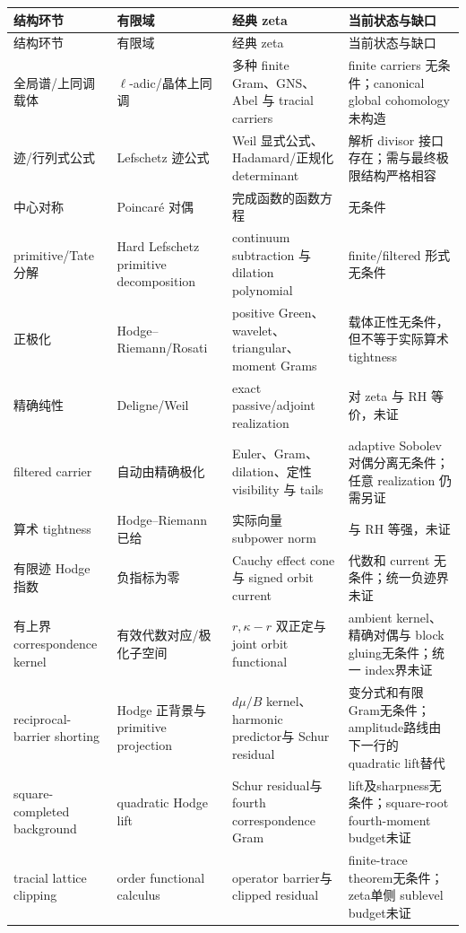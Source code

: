 \documentclass[UTF8,11pt,a4paper]{ctexart}
\theoremstyle{definition}
\theoremstyle{remark}
\newcommand{\1}{\mathbf 1}
\begin{document}
\begingroup\small
\begin{longtable}{@{}>{\raggedright\arraybackslash}p{}p{}p{}p{}@{}}
\toprule
结构环节 & 有限域 & 经典 zeta & 当前状态与缺口\\
\midrule
\endfirsthead
\toprule
结构环节 & 有限域 & 经典 zeta & 当前状态与缺口\\
\midrule
\endhead
全局谱/上同调载体 & \(\ell\)-adic/晶体上同调 & 多种 finite Gram、GNS、Abel 与 tracial carriers & finite carriers 无条件；canonical global cohomology 未构造\\
迹/行列式公式 & Lefschetz 迹公式 & Weil 显式公式、Hadamard/正规化 determinant & 解析 divisor 接口存在；需与最终极限结构严格相容\\
中心对称 & Poincar\'e 对偶 & 完成函数的函数方程 & 无条件\\
primitive/Tate 分解 & Hard Lefschetz primitive decomposition & continuum subtraction 与 dilation polynomial & finite/filtered 形式无条件\\
正极化 & Hodge--Riemann/Rosati & positive Green、wavelet、triangular、moment Grams & 载体正性无条件，但不等于实际算术 tightness\\
精确纯性 & Deligne/Weil & exact passive/adjoint realization & 对 zeta 与 RH 等价，未证\\
filtered carrier & 自动由精确极化 & Euler、Gram、dilation、定性 visibility 与 tails & adaptive Sobolev 对偶分离无条件；任意 realization 仍需另证\\
算术 tightness & Hodge--Riemann 已给 & 实际向量 subpower norm & 与 RH 等强，未证\\
有限迹 Hodge 指数 & 负指标为零 & Cauchy effect cone 与 signed orbit current & 代数和 current 无条件；统一负迹界未证\\
有上界 correspondence kernel & 有效代数对应/极化子空间 & $r,\kappa-r$ 双正定与 joint orbit functional & ambient kernel、精确对偶与 block gluing无条件；统一 index界未证\\
reciprocal-barrier shorting & Hodge 正背景与 primitive projection & $d\mu/B$ kernel、harmonic predictor与 Schur residual & 变分式和有限 Gram无条件；amplitude路线由下一行的 quadratic lift替代\\
square-completed background & quadratic Hodge lift & Schur residual与 fourth correspondence Gram & lift及sharpness无条件；square-root fourth-moment budget未证\\
tracial lattice clipping & order functional calculus & operator barrier与 clipped residual & finite-trace theorem无条件；zeta单侧 sublevel budget未证\\

\end{longtable}
\end{document}
